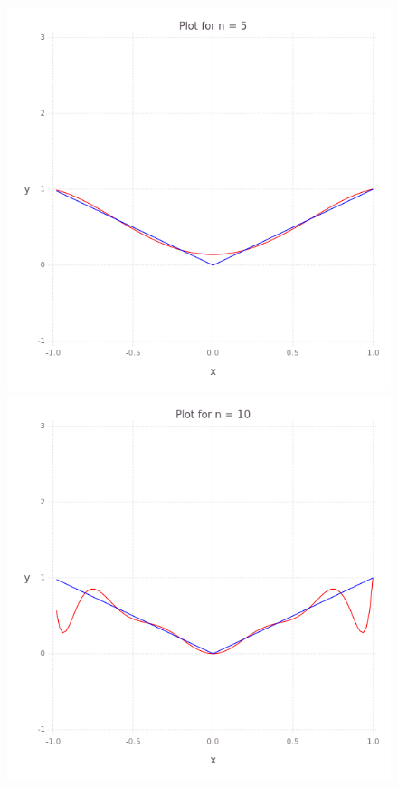 \begin{figure}
  \begin{multicols}{2}
        \includegraphics[width=\linewidth]{../task-6/plots/myplot-abs-5.png}\par 
        \includegraphics[width=\linewidth]{../task-6/plots/myplot-abs-10.png}\par 

\end{multicols}
\end{figure}
